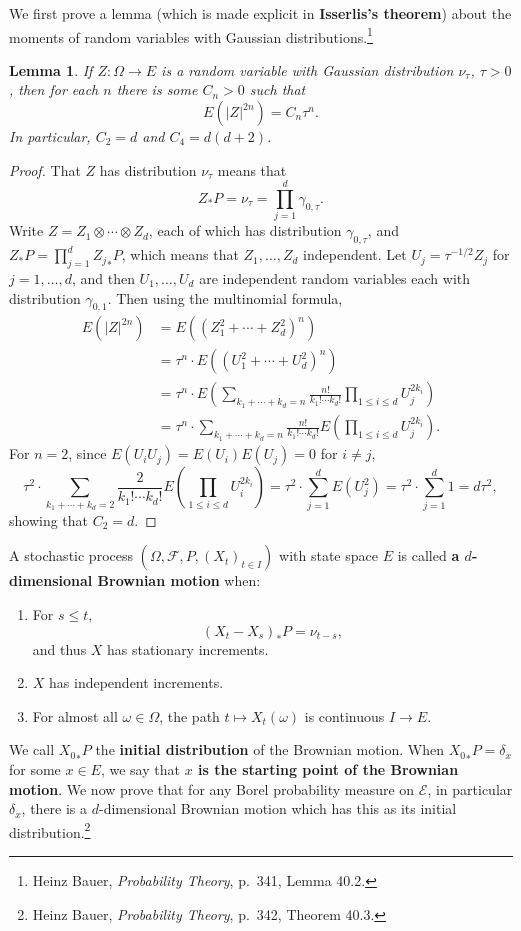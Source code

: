 \documentclass{article}
\newtheorem{lemma}[theorem]{Lemma}
\theoremstyle{definition}
\begin{document}
We first prove a lemma (which is made explicit in \textbf{Isserlis's theorem}) about the moments of random variables with Gaussian distributions.\footnote{Heinz Bauer,
{\em Probability Theory}, p.~341, Lemma 40.2.}

\begin{lemma}
If $Z:\Omega \to E$ is a random variable with Gaussian distribution $\nu_\tau$, $\tau>0$, then for each $n$ there is some
$C_n>0$ such that 
\[
E(|Z|^{2n})=C_n \tau^n.
\]
In particular, $C_2=d$ and $C_4=d(d+2)$. 
\label{isserlis}
\end{lemma}
\begin{proof}
That $Z$ has distribution $\nu_\tau$ means that
\[
Z_*P = \nu_\tau = \prod_{j=1}^d \gamma_{0,\tau}.
\]
Write $Z=Z_1 \otimes \cdots \otimes Z_d$, each of which has 
distribution $\gamma_{0,\tau}$, and
$Z_*P=\prod_{j=1}^d {Z_j}_*P$, which means that $Z_1,\ldots,Z_d$
 independent.
Let $U_j=\tau^{-1/2} Z_j$ for $j=1,\ldots,d$, and then $U_1,\ldots,U_d$ are independent random variables
each with distribution $\gamma_{0,1}$. Then using the multinomial formula,
\begin{align*}
E(|Z|^{2n})&=E((Z_1^2+\cdots+Z_d^2)^n)\\
&= \tau^n \cdot E((U_1^2+\cdots+U_d^2)^n)\\
&=\tau^n\cdot E\left( \sum_{k_1+\cdots+k_d=n} \frac{n!}{k_1! \cdots k_d!} \prod_{1 \leq i \leq d} U_j^{2k_i} \right)\\
&=\tau^n \cdot \sum_{k_1+\cdots+k_d=n} \frac{n!}{k_1! \cdots k_d!} E\left(\prod_{1 \leq i \leq d} U_j^{2k_i} \right).
\end{align*}
For $n=2$, since $E(U_i U_j)=E(U_i)E(U_j)=0$ for $i \neq j$,
\[
\tau^2\cdot \sum_{k_1+\cdots+k_d=2} \frac{2}{k_1! \cdots k_d!} E\left(\prod_{1 \leq i \leq d} U_i^{2k_i} \right)
=\tau^2 \cdot \sum_{j=1}^d E(U_j^2)=\tau^2 \cdot \sum_{j=1}^d 1 = d\tau^2,
\]
showing that $C_2=d$. 
\end{proof}


A stochastic process 
$(\Omega,\mathscr{F},P,(X_t)_{t \in I})$
with state space $E$ is called \textbf{a $d$-dimensional Brownian motion} when:
\begin{enumerate}
\item For $s \leq t$,
\[
(X_t-X_s)_*P = \nu_{t-s},
\]
and thus $X$ has stationary increments.
\item $X$ has independent increments.
\item For almost all $\omega \in \Omega$, the path $t \mapsto X_t(\omega)$ is continuous
$I \to E$. 
\end{enumerate}
We call ${X_0}_*P$ the \textbf{initial distribution} of the Brownian motion. When
${X_0}_*P=\delta_x$ for some $x \in E$, we say that \textbf{$x$ is the starting point of the Brownian motion}.
We now prove that for any Borel probability measure on $\mathscr{E}$, in particular $\delta_x$, there is a
$d$-dimensional Brownian
motion which has this as its initial distribution.\footnote{Heinz Bauer, {\em Probability Theory},
p.~342, Theorem 40.3.}
\end{document}
